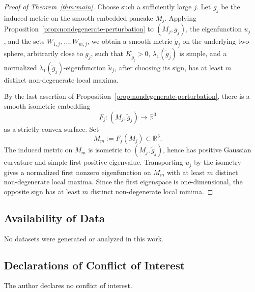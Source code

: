 \documentclass[11pt]{amsart}
\numberwithin{equation}{section}
\newcommand{\R}{\mathbb R}
\begin{document}
\begin{proof}[Proof of Theorem~\ref{thm:main}]
Choose such a sufficiently large $j$.  Let $g_j$ be the induced metric on the
smooth embedded pancake $M_j$.  Applying
Proposition~\ref{prop:nondegenerate-perturbation} to
$(M_j,g_j)$, the eigenfunction $u_j$, and the sets
$W_{1,j},\ldots,W_{m,j}$, we obtain a smooth metric $\widetilde g_j$ on the
underlying two-sphere, arbitrarily close to $g_j$, such that
$K_{\widetilde g_j}>0$, $\lambda_1(\widetilde g_j)$ is simple, and a normalized
$\lambda_1(\widetilde g_j)$-eigenfunction $\widetilde u_j$, after choosing its
sign, has at least $m$ distinct non-degenerate local maxima.

By the last assertion of Proposition~\ref{prop:nondegenerate-perturbation},
there is a smooth isometric embedding
$$
F_j:(M_j,\widetilde g_j)\longrightarrow \R^3
$$
as a strictly convex surface.  Set
$$
M_m:=F_j(M_j)\subset\R^3.
$$
The induced metric on $M_m$ is isometric to $(M_j,\widetilde g_j)$, hence has
positive Gaussian curvature and simple first positive eigenvalue.  Transporting
$\widetilde u_j$ by the isometry gives a normalized first nonzero eigenfunction
on $M_m$ with at least $m$ distinct non-degenerate local maxima.  Since the first
eigenspace is one-dimensional, the opposite sign has at least $m$ distinct
non-degenerate local minima.
\end{proof}

\subsection*{Availability of Data}
No datasets were generated or analyzed in this work.

\subsection*{Declarations of Conflict of Interest}
The author declares no conflict of interest.
\end{document}
